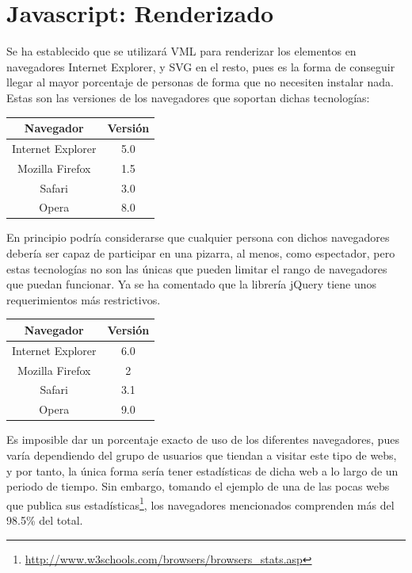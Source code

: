 \section{Javascript: Renderizado}
Se ha establecido que se utilizará VML para renderizar los elementos en navegadores Internet Explorer, y SVG en el resto, pues es la forma de conseguir llegar al mayor porcentaje de personas de forma que no necesiten instalar nada. Estas son las versiones de los navegadores que soportan dichas tecnologías:

\begin{table}[h]
	\centering
		\begin{tabular}{|c|c|}
			\hline
			Navegador & Versión \\
			\hline
			Internet Explorer & 5.0 \\
			\hline
			Mozilla Firefox & 1.5 \\
			\hline
			Safari & 3.0 \\
			\hline
			Opera & 8.0 \\
			\hline
		\end{tabular}
\end{table}

En principio podría considerarse que cualquier persona con dichos navegadores debería ser capaz de participar en una pizarra, al menos, como espectador, pero estas tecnologías no son las únicas que pueden limitar el rango de navegadores que puedan funcionar. Ya se ha comentado que la librería jQuery tiene unos requerimientos más restrictivos.

\begin{table}[h]
	\centering
		\begin{tabular}{|c|c|}
			\hline
			Navegador & Versión \\
			\hline
			Internet Explorer & 6.0 \\
			\hline
			Mozilla Firefox & 2 \\
			\hline
			Safari & 3.1 \\
			\hline
			Opera & 9.0 \\
			\hline
		\end{tabular}
\end{table}

Es imposible dar un porcentaje exacto de uso de los diferentes navegadores, pues varía dependiendo del grupo de usuarios que tiendan a visitar este tipo de webs, y por tanto, la única forma sería tener estadísticas de dicha web a lo largo de un periodo de tiempo. Sin embargo, tomando el ejemplo de una de las pocas webs que publica sus estadísticas\footnote{\url{http://www.w3schools.com/browsers/browsers_stats.asp}}, los navegadores mencionados comprenden más del 98.5\% del total.

